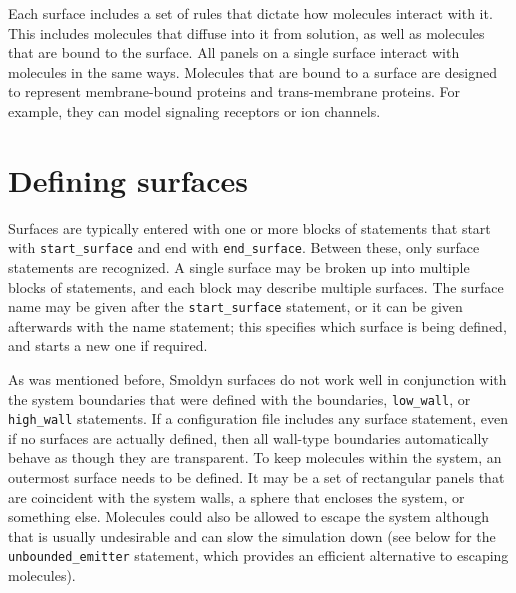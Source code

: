 \documentclass {book}
\newcommand {\ttt} {\texttt}
\begin{document}
Each surface includes a set of rules that dictate how molecules interact with it. This includes molecules that diffuse into it from solution, as well as molecules that are bound to the surface. All panels on a single surface interact with molecules in the same ways. Molecules that are bound to a surface are designed to represent membrane-bound proteins and trans-membrane proteins. For example, they can model signaling receptors or ion channels.

\section{Defining surfaces}

Surfaces are typically entered with one or more blocks of statements that start with \ttt{start\_surface} and end with \ttt{end\_surface}. Between these, only surface statements are recognized. A single surface may be broken up into multiple blocks of statements, and each block may describe multiple surfaces. The surface name may be given after the \ttt{start\_surface} statement, or it can be given afterwards with the name statement; this specifies which surface is being defined, and starts a new one if required.

As was mentioned before, Smoldyn surfaces do not work well in conjunction with the system boundaries that were defined with the boundaries, \ttt{low\_wall}, or \ttt{high\_wall} statements. If a configuration file includes any surface statement, even if no surfaces are actually defined, then all wall-type boundaries automatically behave as though they are transparent. To keep molecules within the system, an outermost surface needs to be defined. It may be a set of rectangular panels that are coincident with the system walls, a sphere that encloses the system, or something else. Molecules could also be allowed to escape the system although that is usually undesirable and can slow the simulation down (see below for the \ttt{unbounded\_emitter} statement, which provides an efficient alternative to escaping molecules).
\end{document}

